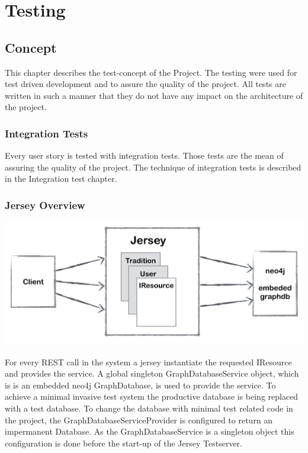 \documentclass[11pt,fleqn,openany]{book} %
\begin{document}
\part{Testing}



\chapter{Concept}
This chapter describes the test-concept of the Project. The testing were used for test driven development and to assure the quality of the project. All tests are written in such a manner that they do not have any impact on the architecture of the project. 

\section*{Integration Tests}
Every user story is tested with integration tests. Those tests are the mean of assuring the quality of the project. The technique of integration tests is described in the Integration test chapter. 

\newpage

\section*{Jersey Overview} 

\begin{center}
\includegraphics[scale=.40]{Pictures/jerseyoverview.png} 
\end{center}

For every REST call in the system a jersey instantiate the requested IResource and provides the service. A global singleton GraphDatabaseService object, which is is an embedded neo4j GraphDatabase, is used to provide the service. To achieve a minimal invasive test system the productive database is being replaced with a test database. To change the database with minimal test related code in the project, the GraphDatabaseServiceProvider is configured to return an impermanent Database. As the GraphDatabaseService is a singleton object this configuration is done before the start-up of the Jersey Testserver.
\end{document}
